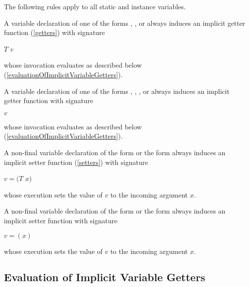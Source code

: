 \documentclass{article}
\begin{document}
\LMHash{}
The following rules apply to all static and instance variables.

\LMHash{}
A variable declaration of one of the forms ,  ,  or  always induces an implicit getter function (\ref{getters}) with signature

$T$ \GET{} $v$

whose invocation evaluates as described below (\ref{evaluationOfImplicitVariableGetters}).

\LMHash{}
A variable declaration of one of the forms , , ,  or  always induces an implicit getter function with signature

\GET{} $v$

whose invocation evaluates as described below (\ref{evaluationOfImplicitVariableGetters}).

\LMHash{}
A non-final variable declaration of the form  or the form  always induces an implicit setter function (\ref{setters}) with signature

 \VOID{} \SET{} $v=(T$ $x)$

whose execution sets the value of $v$ to the incoming argument $x$.

\LMHash{}
A non-final variable declaration of the form  or the form  always induces an implicit setter function with signature

\SET{} $v=(x)$

whose execution sets the value of $v$ to the incoming argument $x$.


\subsection{Evaluation of Implicit Variable Getters}
\end{document}
